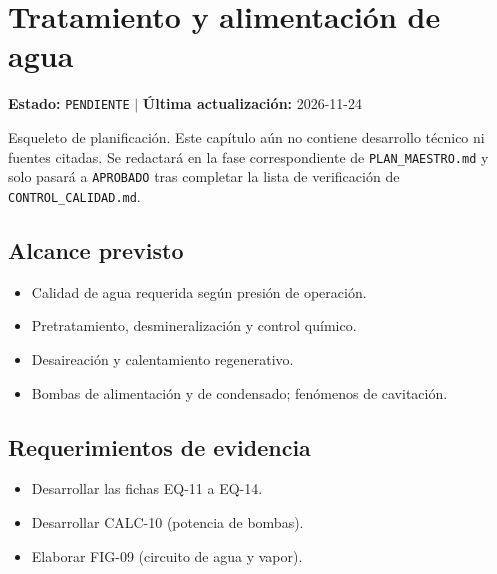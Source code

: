 \chapter{Tratamiento y alimentación de agua}
\label{cap:08}

\begin{cajaestado}
\textbf{Estado:} \texttt{PENDIENTE} \quad$|$\quad
\textbf{Última actualización:} 2026-11-24

Esqueleto de planificación. Este capítulo aún no contiene desarrollo técnico ni
fuentes citadas. Se redactará en la fase correspondiente de
\texttt{PLAN\_MAESTRO.md} y solo pasará a \texttt{APROBADO} tras completar
la lista de verificación de \texttt{CONTROL\_CALIDAD.md}.
\end{cajaestado}

\section{Alcance previsto}
\begin{itemize}
  \item Calidad de agua requerida según presión de operación.
  \item Pretratamiento, desmineralización y control químico.
  \item Desaireación y calentamiento regenerativo.
  \item Bombas de alimentación y de condensado; fenómenos de cavitación.
\end{itemize}

\section{Requerimientos de evidencia}
\begin{itemize}
  \item Desarrollar las fichas EQ-11 a EQ-14.
  \item Desarrollar CALC-10 (potencia de bombas).
  \item Elaborar FIG-09 (circuito de agua y vapor).
\end{itemize}
